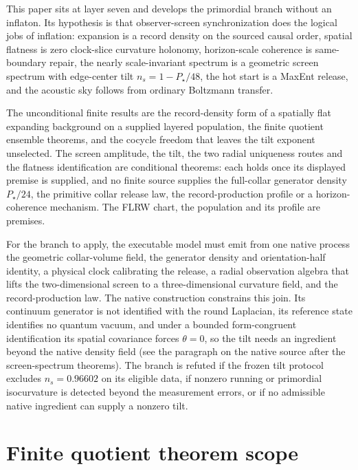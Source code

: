 \documentclass[11pt]{article}
\theoremstyle{remark}
\theoremstyle{plain}
\begin{document}
This paper sits at layer seven and develops the primordial branch without an
inflaton. Its hypothesis is that observer-screen synchronization does the
logical jobs of inflation: expansion is a record density on the sourced
causal order, spatial flatness is zero clock-slice curvature holonomy,
horizon-scale coherence is same-boundary repair, the nearly scale-invariant
spectrum is a geometric screen spectrum with edge-center tilt
\(n_s=1-P_\star/48\), the hot start is a MaxEnt release, and the acoustic
sky follows from ordinary Boltzmann transfer.

The unconditional finite results are the record-density form of a
spatially flat expanding background on a supplied layered population, the
finite quotient ensemble theorems, and the cocycle freedom that leaves the
tilt exponent unselected. The screen amplitude, the tilt, the two radial
uniqueness routes and the flatness identification are conditional theorems:
each holds once its displayed premise is supplied, and no finite source
supplies the full-collar generator density \(P_\star/24\), the primitive
collar release law, the record-production profile or a horizon-coherence
mechanism. The FLRW chart, the population and its profile are premises.

For the branch to apply, the executable model must emit from one native
process the geometric collar-volume field, the generator density and
orientation-half identity, a physical clock calibrating the release, a
radial observation algebra that lifts the two-dimensional screen to a
three-dimensional curvature field, and the record-production law. The
native construction constrains this join. Its continuum generator is not
identified with the round Laplacian, its reference state identifies no
quantum vacuum, and under a bounded form-congruent identification its
spatial covariance forces \(\theta=0\), so the tilt needs an ingredient
beyond the native density field (see the paragraph on the native source
after the screen-spectrum theorems). The
branch is refuted if the frozen tilt protocol excludes \(n_s=0.96602\) on
its eligible data, if nonzero running or primordial isocurvature is detected
beyond the measurement errors, or if no admissible native ingredient can
supply a nonzero tilt.

\section{Finite quotient theorem scope}


\end{document}
